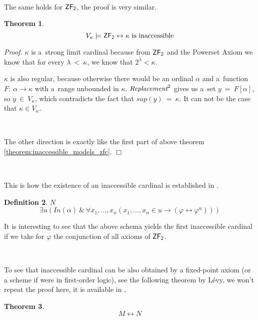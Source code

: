 \documentclass[12pt,a4paper]{article}
\newtheorem{theorem}{Theorem}[section]
\newtheorem{definition}[theorem]{Definition}
\newenvironment{proof}
{\noindent \textit{Proof.}}
{\hspace*{\fill} $\Box$}
\renewcommand{\iff}{\leftrightarrow}
\newcommand{\then}{\rightarrow}
\begin{document}
\

The same holds for $\sf{ZF}_2$, the proof is very similar.
\begin{theorem}\label{theorem:inaccessible_models_zfc_2}
\begin{equation}
V_\kappa \models \sf{ZF}_2 \iff \mbox{$\kappa$ is inaccessible}
\end{equation}
\end{theorem}
\begin{proof}
$\kappa$ is a~strong limit cardinal because from $\sf{ZF}_2$ and the Powerset Axiom we know that for every $\lambda\ <\ \kappa$, we know that $2^{\lambda} < \kappa$.

$\kappa$ is also regular, because otherwise there would be an ordinal $\alpha$ and a~function $F:\ \alpha \then \kappa$ with a~range unbounded in $\kappa$. 
$\emph{Replacement}^2$ gives us a~set $y\ =\ F[\alpha]$, so $y\ \in\ V_\kappa$, which contradicts the fact that $sup(y)\ =\ \kappa$. It can not be the case that $\kappa \in V_\kappa$.

\

The other direction is exactly like the first part of above theorem \ref{theorem:inaccessible_models_zfc}.
\end{proof}

\

This is how the existence of an inaccessible cardinal is established in \cite{Levy60a}. 
\begin{definition}{$N$}\\
\begin{equation}
\exists u (In(\alpha)\ \&\ \forall x_1, \ldots, x_n (x_1, \ldots, x_n \in u \then (\varphi \iff \varphi^u)))
\end{equation}
\end{definition}
It is interesting to see that the above schema yields the first inaccessible cardinal if we take for $\varphi$ the conjunction of all axioms of $\sf{ZF_2}$.

\

To see that inaccessible cardinal can be also obtained by a fixed-point axiom (or a scheme if were in first-order logic), see the following theorem by Lévy, we won't repeat the proof here, it is available in \cite[Theorem 3]{Levy60a}, 
\begin{theorem}\label{theorem:levy_m_iff_n}
\begin{equation}
M \iff N
\end{equation}
\end{theorem}
\end{document}
